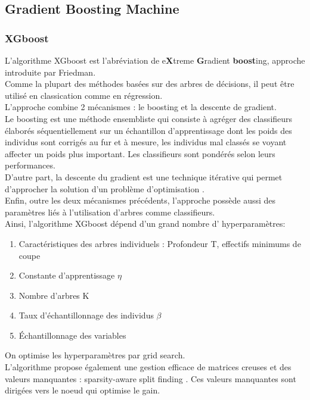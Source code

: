 \documentclass[french]{article}
\begin{document}
\begin{multicols}{2}
\subsection{Gradient Boosting Machine}
\subsubsection{XGboost}
L’algorithme XGboost est l'abréviation de e\textbf{X}treme \textbf{G}radient \textbf{boost}ing, approche introduite par Friedman\footnotemark[11].\\
Comme la plupart des méthodes basées sur des arbres de décisions, il peut être utilisé en classication comme en régression.\\
L'approche combine 2 mécanismes : le boosting et la descente de gradient.\\
Le boosting est une méthode ensembliste qui consiste à agréger des classifieurs élaborés séquentiellement sur un échantillon d’apprentissage dont les poids des individus sont corrigés au fur et à mesure, les individus mal classés se voyant affecter un poids plus important. Les classifieurs sont pondérés selon leurs performances.\\
D'autre part, la descente du gradient est une technique itérative qui permet d’approcher la solution d’un problème d’optimisation \cite{art1}.\\
Enfin, outre les deux mécanismes précédents, l’approche possède aussi des paramètres liés à l’utilisation d’arbres comme classifieurs.\\
Ainsi, l’algorithme XGboost dépend d’un grand nombre d' hyperparamètres: 
\begin{enumerate}
    \item Caractéristiques des
arbres individuels : Profondeur T, effectifs minimums de coupe 
\item Constante
d'apprentissage $\eta$
\item Nombre d'arbres K
\item Taux d'échantillonnage des individus $\beta$
\item Échantillonnage des variables
\end{enumerate}
On optimise les hyperparamètres par grid search.\\
L'algorithme propose également une gestion efficace de matrices creuses et des valeurs manquantes : \og sparsity-aware split finding \cite{chen2016xgboost} \fg{}. Ces valeurs manquantes sont dirigées vers le noeud qui optimise le gain.


\end{multicols}
\end{document}
